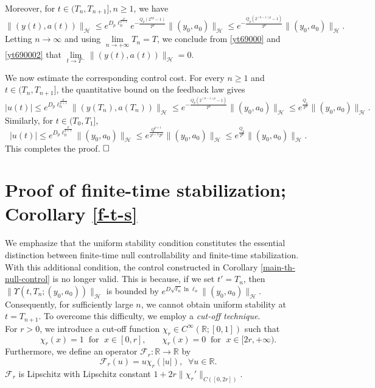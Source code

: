 \documentclass[a4paper]{article}
\numberwithin{equation}{section}
\begin{document}
\begin{appendices}
Moreover, for $t\in (T_n,T_{n+1}],n\ge 1$, we have
\begin{equation}\label{yt690002}\|(y(t),a(t))\|_{\mathcal{H}}\le
e^{D_p\ell_n^{\frac{p}{p+1}}}e^{-\frac{Q_p(2^{np}-1)}{T^p}}
\|(y_0,a_0)\|_{\mathcal{H}}\le e^{-\frac{Q_p(2^{(n-1)p}-1)}{T^p}}\|(y_0,a_0)\|_{\mathcal{H}}.\end{equation}
Letting $n\to\infty$ and using $\lim\limits_{n\to+\infty}T_n=T$, we conclude from \eqref{yt69000} and \eqref{yt690002} that $\lim\limits_{t\to T^-}\|(y(t),a(t))\|_{\mathcal{H}}=0$. 

We now estimate the corresponding control cost. For every $n\ge 1$ and $t\in(T_{n},T_{n+1}]$, the quantitative bound on the feedback law gives
$$|u(t)|\le e^{D_p\ell_{n}^{\frac{p}{p+1}}}\|(y(T_{n}),a(T_{n}))\|_{\mathcal{H}}\le e^{-\frac{Q_p(2^{(n-1)p}-1)}{T^p}}\|(y_0,a_0)\|_{\mathcal{H}}\le e^{\frac{Q_p}{T^p}}\|(y_0,a_0)\|_{\mathcal{H}}.$$
Similarly, for $t\in(T_0,T_1]$,
$$|u(t)|\le e^{D_p\ell_{0}^{\frac{p}{p+1}}}\|(y_0,a_0)\|_{\mathcal{H}}\le e^{\frac{Q^{p+1}}{2^{p+2}T^p}}\|(y_0,a_0)\|_{\mathcal{H}}\le e^{\frac{Q_p}{T^p}}\|(y_0,a_0)\|_{\mathcal{H}}.$$
This completes the proof. $\hfill\square$


\section{\large{Proof of finite-time stabilization; Corollary \ref{f-t-s}}}

We emphasize that the uniform stability condition constitutes the essential distinction between finite-time null controllability and finite-time stabilization. With this additional condition, the control constructed in Corollary \ref{main-th-null-control} is no longer valid. This is because, if we set $t'=T_n$, then $\|\Upsilon(t,T_n;(y_0,a_0))\|_{\mathcal{H}}$ is bounded by $e^{D\sqrt{\ell_n}\ln \ell_n}\|(y_0,a_0)\|_{\mathcal{H}}$. Consequently, for sufficiently large $n$, we cannot obtain uniform stability at $t=T_{n+1}$. To overcome this difficulty, we employ a \textit{cut-off technique}. \\[-2mm] 

For $r>0$, we introduce a cut-off function $\chi_r\in C^{\infty}(\mathbb{R};[0,1])$ such that
$$\chi_r(x)=1\;\;\text{for }\;x\in [0,r],\quad\;\;\;\chi_r(x)=0\;\;\text{for }\;x\in [2r,+\infty).$$
Furthermore, we define an operator $\mathcal{F}_r:\mathbb{R}\to\mathbb{R}$ by
$$\mathcal{F}_r (u)=u\chi_r(|u|),\;\;\forall u\in\mathbb{R}.$$
$\mathcal{F}_r$ is Lipschitz with Lipschitz constant $1+2r\|\chi_r'\|_{C([0,2r])}$.


\end{appendices}
\end{document}
